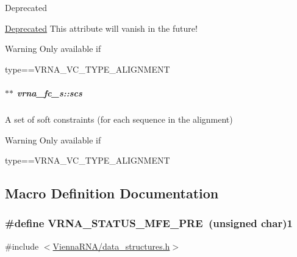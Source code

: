 \begin{DoxyRefDesc}{Deprecated}
\item[\hyperlink{deprecated__deprecated000052}{Deprecated}]This attribute will vanish in the future! \begin{DoxyWarning}{Warning}
Only available if\begin{DoxyVerb}type==VRNA_VC_TYPE_ALIGNMENT \end{DoxyVerb}
 
\end{DoxyWarning}
\end{DoxyRefDesc}
\hypertarget{group__fold__compound_ac2b047fddabc51a76a96511174e47db1}{}
\subparagraph[{scs}]{$\ast$$\ast$ vrna\+\_\+fc\+\_\+s\+::scs}\label{group__fold__compound_ac2b047fddabc51a76a96511174e47db1}


A set of soft constraints (for each sequence in the alignment) 

\begin{DoxyWarning}{Warning}
Only available if\begin{DoxyVerb}type==VRNA_VC_TYPE_ALIGNMENT \end{DoxyVerb}
 
\end{DoxyWarning}


\subsection{Macro Definition Documentation}
\hypertarget{group__fold__compound_ga1a5053dc8acbb0111e852988726f07d6}{}
\subsubsection[{V\+R\+N\+A\+\_\+\+S\+T\+A\+T\+U\+S\+\_\+\+M\+F\+E\+\_\+\+P\+R\+E}]{\setlength{\rightskip}{0pt plus 5cm}\#define V\+R\+N\+A\+\_\+\+S\+T\+A\+T\+U\+S\+\_\+\+M\+F\+E\+\_\+\+P\+R\+E~(unsigned char)1}\label{group__fold__compound_ga1a5053dc8acbb0111e852988726f07d6}


{\ttfamily \#include $<$\hyperlink{data__structures_8h}{Vienna\+R\+N\+A/data\+\_\+structures.\+h}$>$}



